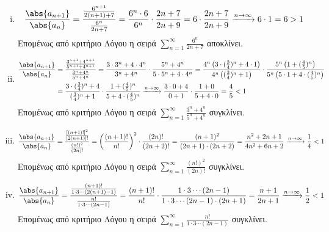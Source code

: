 \documentclass[a4paper,table]{report}
\begin{document}
\begin{enumerate}
\begin{enumerate}[i)]
      \item 
        \[
          \frac{\abs{a_{n+1}}}{\abs{a_{n}}} = \frac{\frac{6^{n+1}}{2(n+1)+7}}
          {\frac{6^{n}}{2n+7}} = \frac{6^{n}\cdot 6}{6^{n}} \cdot 
          \frac{2n+7}{2n+9} = 6 \cdot \frac{2n+7}{2n+9} 
          \xrightarrow{n \to \infty} 6 \cdot 1 = 6>1
        \] 
        Επομένως από κριτήριο Λόγου η σειρά 
        $ \sum_{n=1}^{\infty} \frac{6^{n}}{2n+7} $ αποκλίνει.

      \item 
        \begin{align*}
          \frac{\abs{a_{n+1}}}{\abs{a_{n}}}
                &=\frac{\frac{3^{n+1}+4^{n+1}}{5^{n+1}
                +4^{n+1}}}{\frac{3^{n}+4^{n}}{5^{n}+4^{n}}} = 
                \frac{3 \cdot 3^{n}+ 4\cdot 4^{n}}{3^{n}+4^{n}} \cdot 
                \frac{5^{n}+4^{n}}{5\cdot 5^{n}+ 4 \cdot 4^{n}} = \frac{4^{n}
                  \left(3\cdot (\frac{3}{4})^{n}+4 
                \cdot 1\right)}{4^{n}\left((\frac{3}{4} )^{n}+ 1\right)} \cdot 
                \frac{5^{n}\left(1+ (\frac{4}{5})^{n}\right)}{5^{n}\left(5\cdot 1 + 4
                \cdot(\frac{4}{5} )^{n}\right)} \\ 
                &= \frac{3\cdot (\frac{3}{4})^{n}+4}{(\frac{3}{4} )^{n}+ 1} \cdot 
                \frac{1+ (\frac{4}{5})^{n}}{5 + 4 \cdot(\frac{4}{5} )^{n}} 
                \xrightarrow{n \to \infty} \frac{3 \cdot 0 + 4}{0 + 1 } \cdot 
                \frac{1 + 0}{5 + 4 \cdot 0} = \frac{4}{5} <1
        \end{align*} 
        Επομένως από κριτήριο Λόγου η σειρά $ \sum_{n=1}^{\infty}
        \frac{3^{n}+4^{n}}{5^{n}+4^{n}} $ συγκλίνει.

      \item 
        \[
          \frac{\abs{a_{n+1}}}{\abs{a_{n}}} =
          \frac{\frac{[(n+1)!]^{2}}{[2(n+1)]!}}{\frac{(n!)^{2}}{(2n)!}} = 
          \left(\frac{(n+1)!}{n!}\right)^{2} \cdot \frac{(2n)!}{(2n+2)!} = 
          \frac{(n+1)^{2} }{(2n+1)\cdot (2n+2)} = 
          \frac{n^{2}+2n+1}{4n^{2}+6n+2} \xrightarrow{n \to \infty} 
          \frac{1}{4} <1
        \] 
        Επομένως από κριτήριο Λόγου η σειρά $ \sum_{n=1}^{\infty} \frac{(n!)^{2}}
        {(2n)!} $ συγκλίνει.

      \item 
        \[
          \frac{\abs{a_{n+1}}}{\abs{a_{n}}} = \frac{\frac{(n+1)!}{1\cdot 3 \cdots
          (2(n+1)-1)}}{\frac{n!}{1\cdot 3 \cdots (2n-1)}} = 
          \frac{(n+1)!}{n!} \cdot \frac{1\cdot 3 \cdots (2n-1)}{1\cdot 3 \cdots 
          (2n-1)\cdot (2n+1)} = \frac{n+1}{2n+1} \xrightarrow{n \to \infty} 
          \frac{1}{2} <1 
        \] 
        Επομένως από κριτήριο Λόγου η σειρά $ \sum_{n=1}^{\infty} 
        \frac{n!}{1\cdot 3 \cdots (2n-1)}  $ συγκλίνει.
    \end{enumerate}


\end{enumerate}
\end{document}
